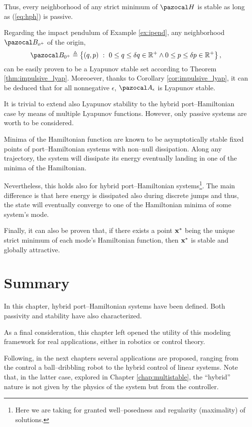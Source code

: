 %
Thus, every neighborhood of any strict minimum of $\Ha$ is stable as long as (\ref{eq:hph}) is passive.
%
\begin{rem}
    Regarding the impact pendulum of Example \ref{ex:ipend}, any neighborhood $\B_{o^+}$ of the origin,
    \begin{equation}
        \B_{0^+}\triangleq \left\{(q,p)~:~0\leq q\leq\delta q\in\R^+\land0\leq p\leq\delta p\in\R^+\right\},
    \end{equation}
    can be easily proven to be a Lyapunov stable set according to Theorem \ref{thm:impulsive_lyap}. Moreoever, thanks to Corollary \ref{cor:impulsive_lyap}, it can be deduced that for all nonnegative $\epsilon$, $\A_\epsilon$ is Lyapunov stable.
\end{rem}
%
It is trivial to extend also Lyapunov stability to the hybrid port--Hamiltonian case by means of multiple Lyapunov functions. However, only passive systems are worth to be considered. 

Minima of the Hamiltonian function are known to be asymptotically stable fixed points of port--Hamiltonian systems with non--null dissipation. Along any trajectory, the system will dissipate its energy eventually landing in one of the minima of the Hamiltonian. 

Nevertheless, this holds also for hybrid port--Hamiltonian systems\footnote{Here we are taking for granted well--posedness and regularity (maximality) of solutions.}. The main difference is that here energy is dissipated also during discrete jumps and thus, the state will eventually converge to one of the Hamiltonian minima of some system's mode.  

Finally, it can also be proven that, if there exists a point $\mathbf{x}^*$ being the unique strict minimum of each mode's Hamiltonian function, then $\mathbf{x}^*$ is stable and globally attractive.
%

%
\clearpage
\section{Summary}
%
In this chapter, hybrid port--Hamiltonian systems have been defined. Both passivity and stability have also characterized.
%
\newline

%
As a final consideration, this chapter left opened the utility of this modeling framework for real applications, either in robotics or control theory.
%
\newline

%
Following, in the next chapters several applications are proposed, ranging from the control a ball--dribbling robot to the hybrid control of linear systems. Note that, in the latter case, explored in Chapter \ref{chap:multistable}, the ``hybrid'' nature is not given by the physics of the system but from the controller.
%